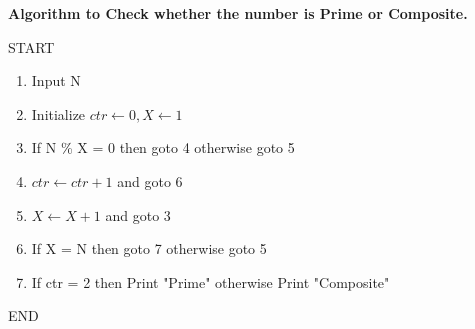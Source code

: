\documentclass{article}
\begin{document}
\begin{center}
\Huge{\bf {Algorithm to Check whether the number is Prime or Composite.}}
\end{center}
\vspace{1.5in}
\Large
START
\begin{enumerate}
\item Input N
\item Initialize $ctr \gets 0, X \gets 1$
\item If N \% X = 0 then goto 4 otherwise goto 5
\item $ctr \gets ctr + 1$ and goto 6
\item $X \gets X + 1$ and goto 3
\item If X = N then goto 7 otherwise goto 5
\item If ctr = 2 then Print "Prime" otherwise Print "Composite"
\end{enumerate}
END
\end{document}
